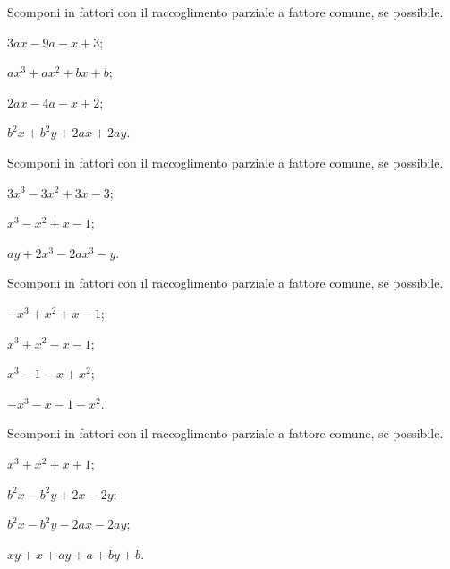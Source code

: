 \begin{esercizio}
\label{ese:13.18}
Scomponi in fattori con il raccoglimento parziale a fattore comune, se possibile.
\begin{multicols}{2}
\begin{enumeratea}
 \item $3ax-9a-x+3$;
 \item $ax^{3}+ax^{2}+bx+b$;
 \item $2ax-4a-x+2$;
 \item $b^{2}x+b^{2}y+2ax+2ay$.
\end{enumeratea}
\end{multicols}
\end{esercizio}

\begin{esercizio}[\Ast]
\label{ese:13.19}
Scomponi in fattori con il raccoglimento parziale a fattore comune, se possibile.
\begin{multicols}{3}
 \begin{enumeratea}
 \item $3x^{3}-3x^{2}+3x-3$;
 \item $x^{3}-x^{2}+x-1$;
 \item $ay+2x^{3}-2ax^{3}-y$.
\end{enumeratea}
\end{multicols}
\end{esercizio}

\begin{esercizio}
\label{ese:13.20}
Scomponi in fattori con il raccoglimento parziale a fattore comune, se possibile.
\begin{multicols}{2}
\begin{enumeratea}
 \item $-x^{3}+x^{2}+x-1$;
 \item $x^{3}+x^{2}-x-1$;
 \item $x^{3}-1-x+x^{2}$;
 \item $-x^{3}-x-1-x^{2}$.
\end{enumeratea}
\end{multicols}
\end{esercizio}

\begin{esercizio}
\label{ese:13.21}
Scomponi in fattori con il raccoglimento parziale a fattore comune, se possibile.
\begin{multicols}{2}
\begin{enumeratea}
 \item $x^{3}+x^{2}+x+1$;
 \item $b^{2}x-b^{2}y+2x-2y$;
 \item $b^{2}x-b^{2}y-2ax-2ay$;
 \item $xy+x+ay+a+by+b$.
\end{enumeratea}
\end{multicols}
\end{esercizio}

